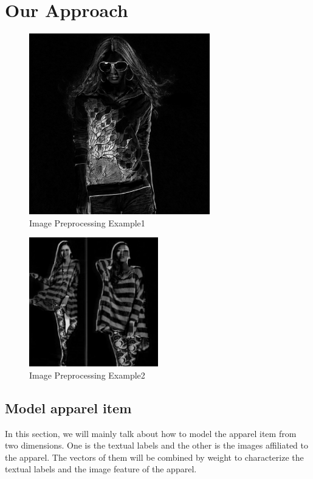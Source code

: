 \section{Our Approach}\label{sec:approach}

\begin{figure}
  \centering
  \includegraphics[width=0.7\textwidth]{image1}
  \caption{Image Preprocessing Example1}
  \label{fig:image1}
\end{figure}

\begin{figure}
  \centering
  \includegraphics[width=0.5\textwidth]{image2}
  \caption{Image Preprocessing Example2}
  \label{fig:image2}
\end{figure}

\subsection{Model apparel item}
In this section, we will mainly talk about how to model the apparel item from two dimensions. One is the textual labels and the other is the images affiliated to the apparel. The vectors of them will be combined by weight to characterize the textual labels and the image feature of the apparel.

